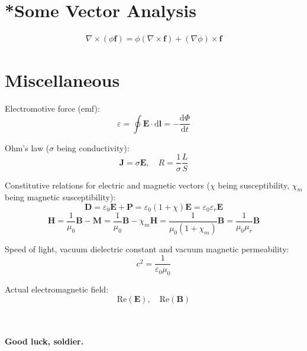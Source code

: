 \documentclass[10pt, a4paper]{article}
\def\d{\mathrm{d}}
\def\epsilon{\varepsilon}
\def\Phi{\varPhi}
\begin{document}
\section{*Some Vector Analysis}

	\begin{align}
		\nabla \times (\phi \bm{f}) = \phi(\nabla \times \bm{f}) + (\nabla \phi) \times \bm{f}
	\end{align}


\section{Miscellaneous}

	Electromotive force (emf): 
	$$\epsilon = \oint \bm{E}\cdot\d \bm{l} = -\dfrac{\d \Phi}{\d t}$$
	
	Ohm's law ($\sigma$ being conductivity): 
	$$\bm{J} = \sigma \bm{E},\quad R = \dfrac{1}{\sigma}\dfrac{L}{S}$$
	
	Constitutive relations for electric and magnetic vectors ($\chi$ being susceptibility, $\chi_m$ being magnetic susceptibility): 
	$$\bm{D} = \epsilon_0\bm{E} + \bm{P} = \epsilon_0(1 + \chi)\bm{E} = \epsilon_0\epsilon_r\bm{E}$$ 
	$$\bm{H} = \dfrac{1}{\mu_0}\bm{B} - \bm{M} = \dfrac{1}{\mu_0}\bm{B} - \chi_m \bm{H} = \dfrac{1}{\mu_0(1+\chi_m)}\bm{B} = \dfrac{1}{\mu_0\mu_r}\bm{B}$$

	Speed of light, vacuum dielectric constant and vacuum magnetic permeability:
	$$c^2 = \dfrac{1}{\epsilon_0\mu_0}$$
	
	Actual electromagnetic field:
	$$\text{Re}\left(\bm{E}\right),\quad \text{Re}\left(\bm{B}\right)$$
	\\
	\\
	\begin{center}
		\textbf{Good luck, soldier.}
	\end{center}
\end{document}
